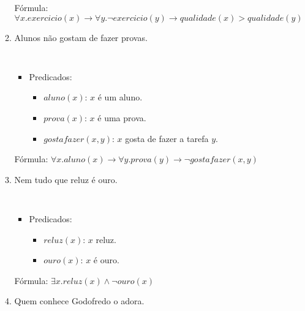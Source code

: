 \documentclass[11pt,a4paper]{report}
\begin{document}
\begin{enumerate}
\begin{enumerate}
\begin{Solucao}
                    F\'ormula: $\forall x. exercicio(x) \to \forall
                    y. \neg exercicio(y) \to qualidade(x) > qualidade(y)$
                    \end{Solucao}
		\item Alunos n\~ao gostam de fazer provas.
                  \begin{Solucao}
                    \verb| |\\
                    \begin{itemize}
                      \item Predicados:
                        \begin{itemize}
                          \item $aluno(x)$: $x$ \'e um aluno.
                           \item $prova(x)$: $x$ \'e uma prova.
                           \item $gostafazer(x,y)$: $x$ gosta de fazer a tarefa $y$.
                         \end{itemize}
                    \end{itemize}
                    F\'ormula: $\forall x. aluno(x) \to \forall
                    y. prova(y) \to \neg gostafazer(x,y)$
                  \end{Solucao}
		\item Nem tudo que reluz \'e ouro.
                  \begin{Solucao}
                    \verb| |\\
                    \begin{itemize}
                      \item Predicados:
                        \begin{itemize}
                          \item $reluz(x)$: $x$ reluz.
                           \item $ouro(x)$: $x$ \'e ouro.
                        \end{itemize}
                    \end{itemize}
                    F\'ormula: $\exists x. reluz(x) \land \neg ouro(x)$
                    \end{Solucao}
		\item Quem conhece Godofredo o adora.
                  \begin{Solucao}
                    \verb| |\\
                    \begin{itemize}

\end{itemize}
\end{Solucao}
\end{enumerate}
\end{enumerate}
\end{document}
